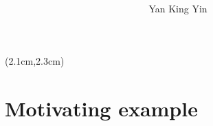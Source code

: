 \newcommand{\logic}[1]{{\color{violet}{\textit{#1}}}}
\newcommand{\underconst}{\texttt{[image: ../2020/UnderConst.png]}}
\newcommand{\KBsymbol}{\vcenter{\hbox{\texttt{[image: ../KB-symbol.png]}}}}
\newcommand{\token}{\vcenter{\hbox{\texttt{[image: token.png]}}}}
\newcommand{\proposition}{\vcenter{\hbox{\texttt{[image: proposition.png]}}}}



\begin{preview}

\title{\vspace{-1.5cm} \bfseries{}}

\author{Yan King Yin} %

\maketitle

\setcounter{section}{-1}
\setcounter{mypage}{0}

\begin{textblock*}{5cm}(2.1cm,2.3cm) %
{\color{red}{\large \textcircled{\small \themypage}}}
\addtocounter{mypage}{1}
\end{textblock*}

\begin{minipage}{\textwidth}
\setlength{\parskip}{0.4\baselineskip}

\section{Motivating example}


\end{minipage}
\end{preview}
